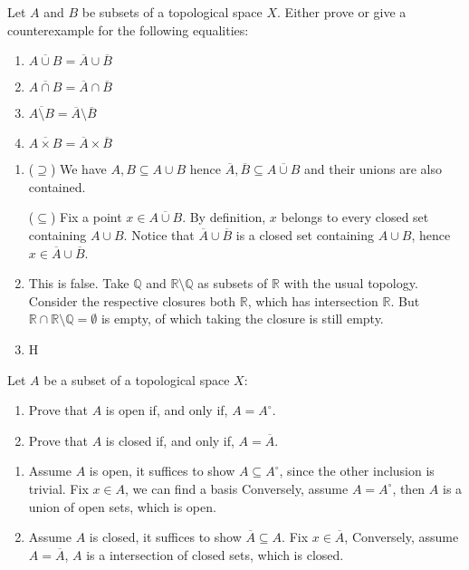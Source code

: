 \documentclass[../main.tex]{subfiles}
\begin{document}
\begin{problem}
    Let $A$ and $B$ be subsets of a topological space $X$.
    Either prove or give a counterexample for the following equalities:
    \begin{enumerate}[label=(\alph*)]
        \item $\overline{A\cup B}=\overline{A}\cup\overline{B}$
        \item $\overline{A\cap B}=\overline{A}\cap\overline{B}$
        \item $\overline{A\setminus B}=\overline{A}\setminus\overline{B}$
        \item $\overline{A\times B}=\overline{A}\times\overline{B}$
    \end{enumerate}
\end{problem}
\begin{enumerate}[label=(\alph*)]
    \item ($\supseteq$)
        We have $A, B \subseteq A \cup B$ hence $\overline{A}, \overline{B} \subseteq \overline{A \cup B}$ and their unions are also contained.

        ($\subseteq$)
        Fix a point $x \in \overline{A \cup B}$.
        By definition, $x$ belongs to every closed set containing $A \cup B$.
        Notice that $\overline{A} \cup \overline{B}$ is a closed set containing $A \cup B$, hence $x \in \overline{A} \cup \overline{B}$.
    \item This is false.
        Take $\mathbb{Q}$ and $\mathbb{R} \setminus \mathbb{Q}$ as subsets of $\mathbb{R}$ with the usual topology.
        Consider the respective closures both $\mathbb{R}$, which has intersection $\mathbb{R}$.
        But $\mathbb{R} \cap \mathbb{R} \setminus \mathbb{Q} = \emptyset$ is empty, of which taking the closure is still empty.
    \item H
\end{enumerate}

\begin{problem}
    Let $A$ be a subset of a topological space $X$:
    \begin{enumerate}[label=(\alph*)]
        \item Prove that $A$ is open if, and only if, $A = A^\circ$.
        \item Prove that $A$ is closed if, and only if, $A = \overline{A}$.
    \end{enumerate}
\end{problem}
\begin{enumerate}[label=(\alph*)]
    \item Assume $A$ is open, it suffices to show $A \subseteq A^\circ$, since the other inclusion is trivial.
        Fix $x \in A$, we can find a basis 
        Conversely, assume $A = A^\circ$, then $A$ is a union of open sets, which is open.
    \item Assume $A$ is closed, it suffices to show $\overline{A} \subseteq A$.
        Fix $x \in \overline{A}$, %
        Conversely, assume $A = \overline{A}$, $A$ is a intersection of closed sets, which is closed.
\end{enumerate}
\end{document}
